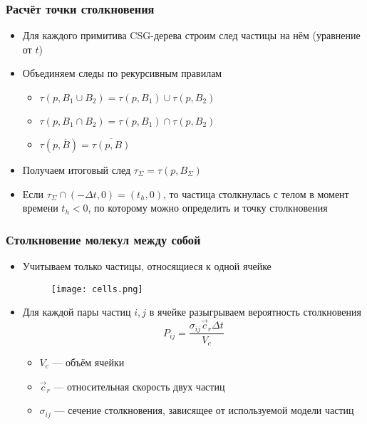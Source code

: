 \documentclass[onlymath]{beamer}
\begin{document}
\begin{frame}
  \frametitle{Расчёт точки столкновения}
  \begin{itemize}
  \item Для каждого примитива CSG-дерева строим след частицы на нём
    (уравнение от $t$)
  \item Объединяем следы по рекурсивным правилам
    \begin{itemize}
    \item $\tau(p, B_1 \cup B_2) = \tau(p, B_1) \cup \tau(p, B_2)$
    \item $\tau(p, B_1 \cap B_2) = \tau(p, B_1) \cap \tau(p, B_2)$
    \item $\tau(p, \overline{B}) = \overline{\tau(p, B)}$
    \end{itemize}
  \item Получаем итоговый след $\tau_\Sigma = \tau(p, B_\Sigma)$
  \item Если $\tau_\Sigma \cap (-\Delta t, 0) = (t_h, 0)$, то
    частица столкнулась с телом в момент времени $t_h < 0$, по
    которому можно определить и точку столкновения
  \end{itemize}
\end{frame}

\begin{frame}
  \frametitle{Столкновение молекул между собой}
  \begin{itemize}
  \item Учитываем только частицы, относящиеся к одной ячейке
    \begin{figure}
      \centering
      \texttt{[image: cells.png]}
    \end{figure}
  \item Для каждой пары частиц $i, j$ в ячейке разыгрываем вероятность
    столкновения
    \begin{equation*}
      P_{ij} = \frac{\sigma_{ij}\vec{c}_r\Delta t}{V_c}
    \end{equation*}
    \begin{itemize}
    \item $V_c$ — объём ячейки
    \item $\vec{c}_r$ — относительная скорость двух частиц
    \item $\sigma_{ij}$ — сечение столкновения, зависящее от
      используемой модели частиц
    \end{itemize}
  \end{itemize}
\end{frame}
\end{document}
